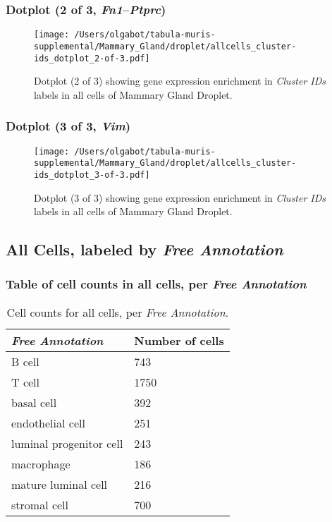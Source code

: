 \clearpage

\subsubsection{Dotplot (2 of 3, \emph{Fn1}--\emph{Ptprc})}
\begin{figure}[h]
\centering
\texttt{[image: /Users/olgabot/tabula-muris-supplemental/Mammary\_Gland/droplet/allcells\_cluster-ids\_dotplot\_2-of-3.pdf]}

\caption{ Dotplot (2 of 3)  showing gene expression enrichment in \emph{Cluster IDs} labels in all cells of Mammary Gland Droplet. }
\end{figure}


\clearpage

\subsubsection{Dotplot (3 of 3, \emph{Vim})}
\begin{figure}[h]
\centering
\texttt{[image: /Users/olgabot/tabula-muris-supplemental/Mammary\_Gland/droplet/allcells\_cluster-ids\_dotplot\_3-of-3.pdf]}

\caption{ Dotplot (3 of 3)  showing gene expression enrichment in \emph{Cluster IDs} labels in all cells of Mammary Gland Droplet. }
\end{figure}


\clearpage

\subsection{All Cells, labeled by \emph{Free Annotation}}
\subsubsection{Table of cell counts in all cells, per \emph{Free Annotation}}\begin{table}[h]
\centering
\label{my-label}
\begin{tabular}{@{}ll@{}}
\toprule

\emph{Free Annotation}& Number of cells \\ \midrule
B cell & 743 \\

T cell & 1750 \\

basal cell & 392 \\

endothelial cell & 251 \\

luminal progenitor cell & 243 \\

macrophage & 186 \\

mature luminal cell & 216 \\

stromal cell & 700 \\
\bottomrule
\end{tabular}
\caption{Cell counts for all cells, per \emph{Free Annotation}.}
\end{table}

